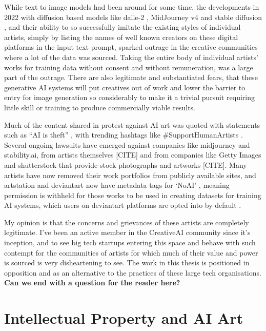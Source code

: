 While text to image models had been around for some time, the developments in 2022 with diffusion based models like dalle-2 \citep{openai2022dalle2}, MidJourney v4 \citep{edwards2022midjourney} and stable diffusion \citep{stability2022stable}, and their ability to so successfully imitate the existing styles of individual artists, simply by listing the names of well known creators on these digital platforms in the input text prompt, sparked outrage in the creative communities where a lot of the data was sourced. 
Taking the entire body of individual artists' works for training data without consent and without remuneration, was a large part of the outrage.
There are also legitimate and substantiated fears, that these generative AI systems will put creatives out of work and lower the barrier to entry for image generation so considerably to make it a trivial pursuit requiring little skill or training to produce commercially viable results.


Much of the content shared in protest against AI art was quoted with statements such as “AI is theft” \citep{whiddington2022backlash}, with trending hashtags like \#SupportHumanArtists \citep{zakuga2022theft}. 
Several ongoing lawsuits have emerged against companies like midjourney and stability.ai, from artists themselves [CITE] and from companies like Getty Images and shutterstock that provide stock photographs and artworks [CITE]. 
Many artists have now removed their work portfolios from publicly available sites, and artstation and deviantart now have metadata tags for ‘NoAI’ \citep{artstation2022noai}, meaning permission is withheld for those works to be used in creating datasets for training AI systems, which users on deviantart platforms are opted into by default \citep{deviantart2022optout}. 

My opinion is that the concerns and grievances of these artists are completely legitimate. 
I've been an active member in the CreativeAI community since it’s inception, and to see big tech startups entering this space and behave with such contempt for the communities of artists for which much of their value and power is sourced is very disheartening to see. 
The work in this thesis is positioned in opposition and as an alternative to the practices of these large tech organisations. 
\textbf{Can we end with a question for the reader here?}

\section{Intellectual Property and AI Art}

